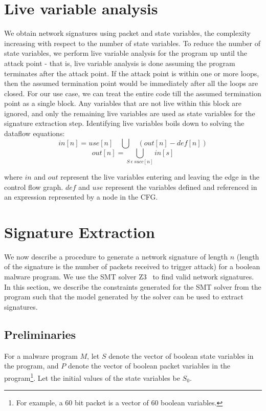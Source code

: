 \documentclass[twocolumn, 11pt]{paper}
\begin{document}
\section{Live variable analysis} \label{sec:livevariableanalysis}
We obtain network signatures using packet and state variables, the complexity increasing with respect to the number of state variables. To reduce the number of state variables, we perform live variable analysis for the program up until the attack point - that is, live variable analysis is done assuming the program terminates after the attack point.
If the attack point is within one or more loops, then the assumed termination point would be immediately after all the loops are closed.
For our use case, we can treat the entire code till the assumed termination point as a single block. Any variables that are not live within this block are ignored, and only the remaining live variables are used as state variables for the signature extraction step.
Identifying live variables boils down to solving the dataflow equations:
$$ in[n] = use[n] \quad \bigcup  \quad (out[n] - def[n]) $$
$$ out[n] = \bigcup_{S \: \epsilon \: succ[n]}  in[s] $$

where $in$ and $out$ represent the live variables entering and leaving the edge in the control flow graph. $def$ and $use$ represent the variables defined and referenced in an expression represented by a node in the CFG.
\section{Signature Extraction} \label{sec:extraction}
We now describe a procedure to generate a network signature
of length $n$ (length of the signature is the number of packets
received to trigger attack) for a boolean malware program. 
We use the SMT solver Z3~\cite{z3}
to find valid network signatures. In this section, we describe
the constraints generated for the SMT solver from the program
such that the model generated by the solver can be used to 
extract signatures. 

\subsection{Preliminaries}
For a malware program $M$, let $S$ denote
the vector of boolean state variables in the program,
and $P$ denote the vector of boolean packet variables
in the program\footnote{
	For example, a 60 bit packet is a vector 
	of 60 boolean variables.}. Let the
initial values of the state variables be $S_{0}$.
\end{document}

